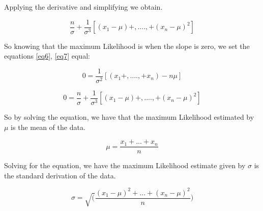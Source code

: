\documentclass[letterpaper,12pt,openright,oneside]{article}
\begin{document}
Applying the derivative and simplifying we obtain.
  
\begin{equation}\label{eq7}
\frac{n}{\sigma} + \frac{1}{\sigma^3}[(x_{1}-\mu)+,....,+ (x_{n} - \mu)^2] 
\end{equation}   
  	


  

So knowing that the maximum Likelihood is when the slope is zero, we set the equations \ref{eq6}, \ref{eq7} equal:  

\begin{equation}
0 = \frac{1}{\sigma^2}[(x_{1} + ,...., + x_{n}) -n \mu] 
\end{equation} 
  
  
\begin{equation}
0 = \frac{n}{\sigma} + \frac{1}{\sigma^3}[(x_{1}-\mu)+,....,+ (x_{n} - \mu)^2] 
\end{equation}   
  	

So by solving the equation, we have that the maximum Likelihood estimated by $ \mu $ is the mean of the data.

\begin{equation}
\mu = \frac{x_{1}+...+x_{n}}{n} 
\end{equation}   
  	
Solving for the equation, we have the maximum Likelihood estimate given by $ \sigma $ is the standard derivation of the data.
	
\begin{equation}
\sigma = \sqrt(\frac{(x_{1}-\mu)^2 +...+ (x_{n} - \mu)^2}{n}) 
\end{equation}   
\end{document}
